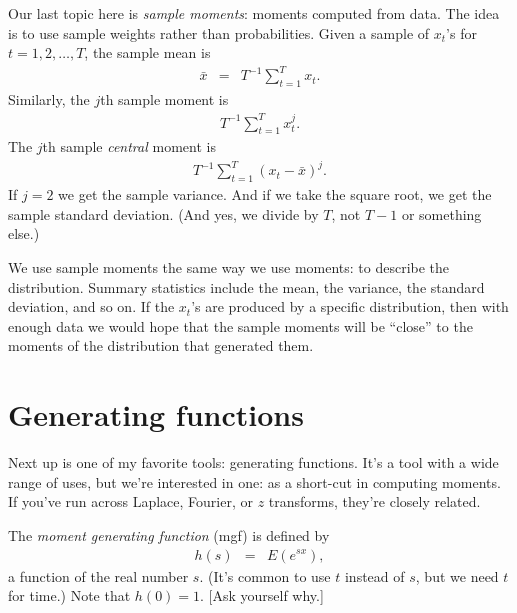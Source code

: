 \documentclass[11pt]{article}
\begin{document}
Our last topic here is {\it sample moments\/}:
moments computed from data.
The idea is to use sample weights rather than probabilities.
Given a sample of $x_t$'s for $t=1,2,\ldots,T$,
the sample mean is
\begin{eqnarray*}
         \bar{x} &=& T^{-1} \sum_{t=1}^T x_t .
\end{eqnarray*}
Similarly, the $j$th sample moment is
\begin{eqnarray*}
         T^{-1} \sum_{t=1}^T x_t^j .
\end{eqnarray*}
The $j$th sample {\it central\/} moment is
\begin{eqnarray*}
         T^{-1} \sum_{t=1}^T (x_t-\bar{x})^j .
\end{eqnarray*}
If $j=2$ we get the sample variance.
And if we take the square root, we get the sample standard deviation.
(And yes, we divide by $T$, not $T-1$ or something else.)

We use sample moments the same way we use moments:  to describe the distribution.
Summary statistics include the mean, the variance, the standard deviation,
and so on.
If the $x_t$'s are produced by a specific distribution,
then with enough data we would hope that the sample moments will be ``close''
to the moments of the distribution that generated them.


\section{Generating functions}

Next up is one of my favorite tools:  generating functions.
It's a tool with a wide range of uses,
but we're interested in one:
as a short-cut in computing moments.
If you've run across Laplace, {Fourier}, or $z$ transforms,
they're closely related.

The {\it moment generating function\/} (mgf) is defined by
\begin{eqnarray}
    h(s) &=& E \left( e^{s x} \right) ,
    \label{eq:def-mgf}
\end{eqnarray}
a function of the real number $s$.
(It's common to use $t$ instead of $s$, but we need $t$ for time.)
Note that $h(0) = 1$.
[Ask yourself why.]
\end{document}
